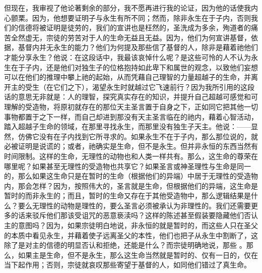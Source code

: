 但现在，我审视了他论著剩余的部分，我不愿再进行我的论证，因为他的话使我内心颤栗。因为，他想要证明子与永生有所不同；然而，除非永生在于子内，否则我们的信德将被证明是徒劳的，我们的宣讲也是枉然的，圣洗成为多余，殉道者的痛苦全然虚无，宗徒的劳苦对于人的生命无益且无益。因为，他们为何宣讲基督，依据，基督内并无永生的能力？他们为何提及那些信了基督的人，除非是藉着祂他们才能分享永生？他说：在这段话中，我最该哀悼什么呢？是这些可怜的人不认为永生在于子内，还是他们对独生子的位格抱持如此卑下和属世的观念，以致他们妄想可以在他们的推理中攀上祂的起始，从而凭藉自己理智的力量超越子的生命，并离开主的受生（在它们之下），渴望永生时就越过它飞速前行？因为我所引用的这段话的意思无非就是：人的理智，探究真实存在的知识，并提升自己超越可感觉和可理解的受造物，将原初就存在的那位天主圣言置于自身之下，正如同它把其他一切事物都置于之下一样，而自己却进到那没有天主圣言临在的祂内，藉着心智活动，踏入超越子生命的领域，在那里寻找永生，而那里没有独生子天主。他说：——显然，仿佛它没有在子内找到它所寻求的。如果永生不在于子内，那么那位说的，就必被证明是说谎的；或者，祂确实是生命，但不是永生。但并非永恒的东西当然有时间限制。这样的生命，无理性的动物也和人类一样共有。那么，这生命的尊荣在哪里呢？如果甚至无理性的受造物也共享它？如果圣言或神圣理性与生命是同一的，那么如果这生命只是在暂时的生命（根据他们的异端）中居于无理性的受造物内，那会怎样？因为，按照伟大的，圣言就是生命，但根据他们的异端，这生命是暂时的而非永生的；而且，暂时的生命又存在于其他受造物中，那么逻辑结果是什么？要么无理性的动物是理性的，要么圣言必须被承认为非理性的。我们还需要更多的话来驳斥他们那该受诅咒的恶意亵渎吗？这样的陈述甚至假装要隐藏他们否认主的意图吗？因为，如果宗徒明白地说，非永恒的就是暂时的，而这些人只在圣父的本质中看见永生，并藉着使子远离圣父的本性，他们也把子从永生中割断了，这除了是对主的信德的明显否认和拒绝，还能是什么？而宗徒明确地说，那些 。那么，如果主是生命，但不是永生，那么这生命当然就是暂时的、仅有一日的，仅在当下起作用；否则，宗徒就哀叹那些寄望于基督的人，如同他们错过了真生命。\par

